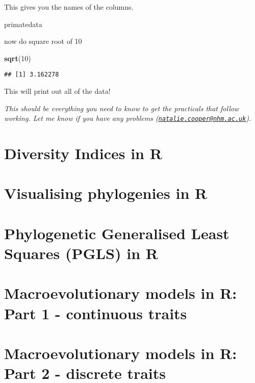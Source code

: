 \documentclass[]{book}
\newenvironment{Shaded}{\begin{snugshade}}{\end{snugshade}}
\newcommand{\KeywordTok}[1]{\textcolor[rgb]{0.13,0.29,0.53}{\textbf{{#1}}}}
\newcommand{\DecValTok}[1]{\textcolor[rgb]{0.00,0.00,0.81}{{#1}}}
\newcommand{\NormalTok}[1]{{#1}}
\begin{document}
This gives you the names of the columns.

\begin{Shaded}
\begin{Highlighting}[]
\NormalTok{primatedata}
\end{Highlighting}
\end{Shaded}

now do square root of 10

\begin{Shaded}
\begin{Highlighting}[]
\KeywordTok{sqrt}\NormalTok{(}\DecValTok{10}\NormalTok{)}
\end{Highlighting}
\end{Shaded}

\begin{verbatim}
## [1] 3.162278
\end{verbatim}

This will print out all of the data!

\emph{This should be everything you need to know to get the practicals
that follow working. Let me know if you have any problems
(\href{mailto:natalie.cooper@nhm.ac.uk}{\nolinkurl{natalie.cooper@nhm.ac.uk}}).}

\chapter{Diversity Indices in R}\label{diversity-indices-in-r}

\chapter{Visualising phylogenies in
R}\label{visualising-phylogenies-in-r}

\chapter{Phylogenetic Generalised Least Squares (PGLS) in
R}\label{phylogenetic-generalised-least-squares-pgls-in-r}

\chapter{Macroevolutionary models in R: Part 1 - continuous
traits}\label{macroevolutionary-models-in-r-part-1---continuous-traits}

\chapter{Macroevolutionary models in R: Part 2 - discrete
traits}\label{macroevolutionary-models-in-r-part-2---discrete-traits}
\end{document}
